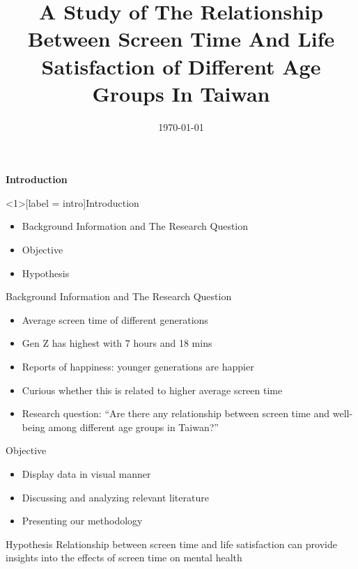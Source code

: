 \documentclass{beamer}
\title{\textbf{A Study of The Relationship Between Screen Time And Life Satisfaction of Different Age Groups In Taiwan}}
\author{{\small Fausto Urrutia (B11303091) \and \small Chintara Sahelangi (B12303097) \and \small Yanisa Saengcharoensuklert (B11303085)}}
\date{\today}
\begin{document}
\maketitle

\begin{frame}
    \centering
    \Huge\textbf{Introduction}
\end{frame}

\begin{frame}<1>[label = intro]{Introduction}
    \begin{itemize}
        \item<1-> Background Information and The Research Question
        \item<2-> Objective
        \item<3-> Hypothesis
    \end{itemize}
\end{frame}

\begin{frame}{Background Information and The Research Question}
    \begin{itemize}
        \item<+-> Average screen time of different generations 
        \item<+-> Gen Z has highest with 7 hours and 18 mins
        \item<+-> Reports of happiness: younger generations are happier
        \item<+-> Curious whether this is related to higher average screen time
        \item<+-> Research question: “Are there any relationship between screen time and well-being among different age groups in Taiwan?”
    \end{itemize}
\end{frame}


\begin{frame}{Objective}
    \begin{itemize}
        \item<+-> Display data in visual manner
        \item<+-> Discussing and analyzing relevant literature
        \item<+-> Presenting our methodology
    \end{itemize}
\end{frame}


\begin{frame}{Hypothesis}
    \centering
    {\LARGE Relationship between screen time and life satisfaction can provide insights into the effects of screen time on mental health}
\end{frame}
\end{document}
